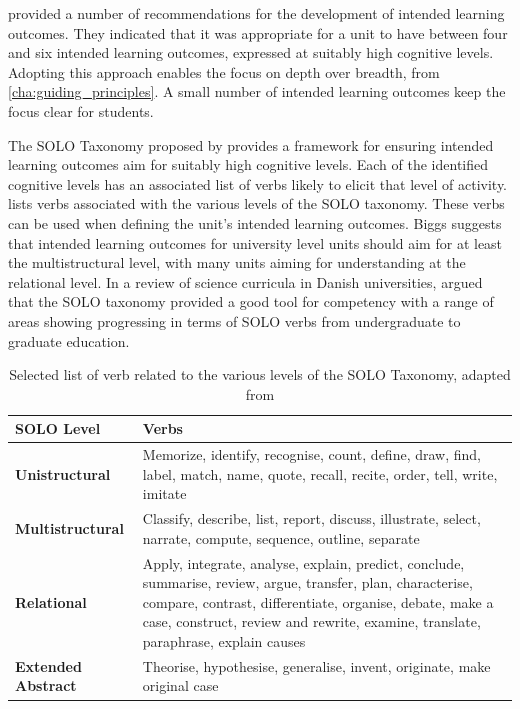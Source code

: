 \citet{Biggs:2007} provided a number of recommendations for the development of intended learning outcomes. They indicated that it was appropriate for a unit to have between four and six intended learning outcomes, expressed at suitably high cognitive levels. Adopting this approach enables the focus on depth over breadth,  from \cref{cha:guiding_principles}. A small number of intended learning outcomes keep the focus clear for students.


The SOLO Taxonomy proposed by \citet{Biggs:1982} provides a framework for ensuring intended learning outcomes aim for suitably high cognitive levels. Each of the identified cognitive levels has an associated list of verbs likely to elicit that level of activity.  lists verbs associated with the various levels of the SOLO taxonomy. These verbs can be used when defining the unit's intended learning outcomes. Biggs suggests that intended learning outcomes for university level units should aim for at least the multistructural level, with many units aiming for understanding at the relational level. In a review of science curricula in Danish universities, \citet{Brabrand:2009} argued that the SOLO taxonomy provided a good tool for competency with a range of areas showing progressing in terms of SOLO verbs from undergraduate to graduate education.

\begin{table}
	\renewcommand{\arraystretch}{1.6}
	\centering
	\caption{Selected list of verb related to the various levels of the SOLO Taxonomy, adapted from \citet{Biggs:2007}}
 	\label{tbl:solo_verbs}

    \begin{tabular}{lp{10cm}}
    SOLO Level        & Verbs \\
    \hline
    \textbf{Unistructural}     & Memorize, identify, recognise, count, define, draw, find, label, match, name, quote, recall, recite, order, tell, write, imitate\\
    \textbf{Multistructural}   & Classify, describe, list, report, discuss, illustrate, select, narrate, compute, sequence, outline, separate\\
    \textbf{Relational}        & Apply, integrate, analyse, explain, predict, conclude, summarise, review, argue, transfer, plan, characterise, compare, contrast, differentiate, organise, debate, make a case, construct, review and rewrite, examine, translate, paraphrase, explain causes \\
    \textbf{Extended Abstract} & Theorise, hypothesise, generalise, invent, originate, make original case\\
    \end{tabular}
\end{table}

